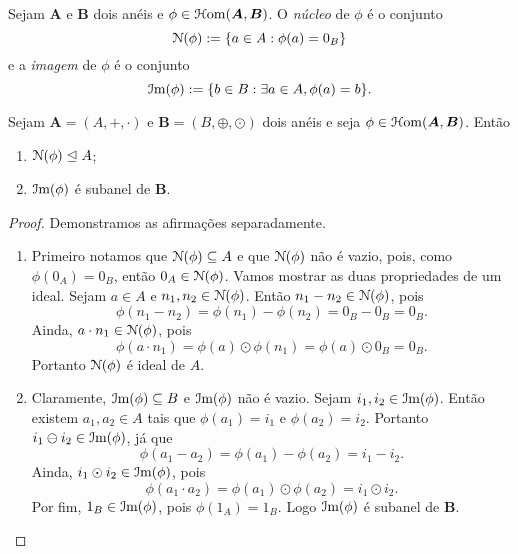 \begin{defi}
	Sejam $\bm A$ e $\bm B$ dois anéis e $\phi \in \mathcal{H}\mathrm{om}(\bm A,\bm B)$. O \emph{núcleo} de $\phi$ é o conjunto
	\begin{equation*}
	\mathcal{N}(\phi) := \{a \in A : \phi(a) = 0_B\}
	\end{equation*}
e a \emph{imagem} de $\phi$ é o conjunto
	\begin{equation*}
	\mathcal{I}\mathrm{m}(\phi) := \{b \in B : \exists a \in A, \phi(a) = b\}.
	\end{equation*}
\end{defi}

\begin{prop}
	Sejam $\bm A=(A,+,\cdot)$ e $\bm B=(B,\oplus,\odot)$ dois anéis e seja $\phi \in \mathcal{H}\mathrm{om}(\bm A,\bm B)$. Então
	\begin{enumerate}
	\item $\mathcal{N}(\phi) \mathrel{\unlhd} A$;
	\item $\mathcal{I}\mathrm{m}(\phi)$ é subanel de $\textbf{B}$.
	\end{enumerate}
\end{prop}
\begin{proof}Demonstramos as afirmações separadamente.
	\begin{enumerate}
	\item Primeiro notamos que $\mathcal{N}(\phi) \subseteq A$ e que $\mathcal{N}(\phi)$ não é vazio, pois, como $\phi(0_A)=0_B$, então $0_A \in \mathcal{N}(\phi)$. Vamos mostrar as duas propriedades de um ideal. Sejam $a \in A$ e $n_1,n_2 \in \mathcal{N}(\phi)$. Então $n_1-n_2 \in \mathcal{N}(\phi)$, pois
	\begin{equation*}
	\phi(n_1-n_2) = \phi(n_1)-\phi(n_2) = 0_B - 0_B = 0_B.
	\end{equation*}
Ainda, $a \cdot n_1 \in \mathcal{N}(\phi)$, pois
	\begin{equation*}
	\phi(a \cdot n_1) = \phi(a) \odot \phi(n_1) = \phi(a) \odot 0_B = 0_B.
	\end{equation*}
Portanto $\mathcal{N}(\phi)$ é ideal de $A$.
	\item Claramente, $\mathcal{I}\mathrm{m}(\phi) \subseteq B$ e $\mathcal{I}\mathrm{m}(\phi)$ não é vazio. Sejam $i_1,i_2 \in \mathcal{I}\mathrm{m}(\phi)$. Então existem $a_1,a_2 \in A$ tais que $\phi(a_1)=i_1$ e $\phi(a_2)=i_2$. Portanto $i_1 \ominus i_2 \in \mathcal{I}\mathrm{m}(\phi)$, já que
	\begin{equation*}
	\phi(a_1-a_2)= \phi(a_1)-\phi(a_2)=i_1-i_2.
	\end{equation*}
Ainda, $i_1 \odot i_2 \in \mathcal{I}\mathrm{m}(\phi)$, pois
	\begin{equation*}
	\phi(a_1 \cdot a_2)= \phi(a_1) \odot \phi(a_2) = i_1 \odot i_2.
	\end{equation*}
Por fim, $1_B \in \mathcal{I}\mathrm{m}(\phi)$, pois $\phi(1_A)=1_B$. Logo $\mathcal{I}\mathrm{m}(\phi)$ é subanel de $\bm B$.
	\end{enumerate}
\end{proof}

